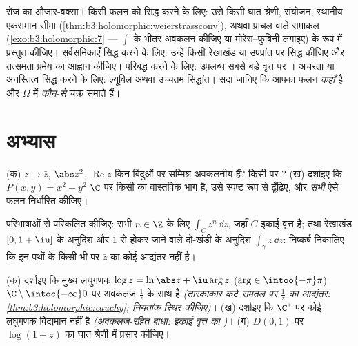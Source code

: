 \begin{method}\label{met:b3:holomorphic:toolkit}
रोज का औजार-बक्सा। किसी फलन को  सिद्ध करने के लिए: उसे
किसी घात श्रेणी, संयोजन, स्थानीय एकसमान सीमा (\cref{thm:b3:holomorphic:weierstrassconv}), अथवा
 प्राचल वाले समाकल (\cref{exo:b3:holomorphic:7} --- $\int$ के भीतर अवकलन
कीजिए या मोरेरा--फुबिनी लगाइए) के रूप में प्रस्तुत कीजिए।
सर्वसमिकाएँ सिद्ध करने के लिए: उन्हें किसी रेखाखंड या उपप्रांत पर
सिद्ध कीजिए और तत्समता प्रमेय का आह्वान कीजिए। परिबद्ध करने के
लिए: उपलब्ध सबसे बड़े वृत्त पर । अचरता या अनस्तित्व सिद्ध
करने के लिए: ल्यूविल अथवा उच्चतम सिद्धांत। सदा जानिए कि आपका फलन
\emph{कहाँ}  है और $\Omega$ में \emph{कौन-से} चक्र समाते
हैं।
\end{method}

\section{अभ्यास}

\begin{exercise}[$\star$]\label{exo:b3:holomorphic:1}
(क) $z \mapsto \bar z$, $\abs z^2$, $\operatorname{Re}z$ किन बिंदुओं पर सम्मिश्र-अवकलनीय हैं? किसी
 पर ?
(ख) दर्शाइए कि $P(x, y) = x^2 - y^2$ $\C$ पर किसी  का वास्तविक भाग
है, उसे स्पष्ट रूप से ढूँढ़िए, और \emph{सभी} ऐसे फलन निर्धारित
कीजिए।
\end{exercise}

\begin{exercise}[$\star$]\label{exo:b3:holomorphic:2}
परिभाषाओं से परिकलित कीजिए: सभी $n
\in \Z$ के लिए $\int_{C}z^n\,\dd z$, जहाँ $C$
इकाई वृत्त है; तथा रेखाखंड $[0, 1+\iu]$ के अनुदिश और $1$ से होकर जाने
वाले दो-खंडी  के अनुदिश $\int_\gamma\bar z\,\dd z$: निष्कर्ष निकालिए कि इन पथों के
किसी भी  पर $\bar z$ का कोई आद्यंतर नहीं है।
\end{exercise}

\begin{exercise}[$\star\star$]\label{exo:b3:holomorphic:3}
(क) दर्शाइए कि मुख्य लघुगणक $\log z = \ln\abs z +
\iu\arg z$ ($\arg \in \intoo{-\pi}\pi$) $\C\setminus\intoc{-\infty}0$ पर अवकलज $\frac1z$
के साथ  है \emph{(तारकाकार कटे समतल पर $\frac1z$ का
आद्यंतर: \cref{thm:b3:holomorphic:cauchy}; नियतांक स्थिर कीजिए)}।
(ख) दर्शाइए कि $\C^*$ पर कोई  लघुगणक विद्यमान नहीं है
\emph{(अवकलज-रहित बाधा: इकाई वृत्त का )}।
(ग) $D(0,1)$ पर $\log(1 + z)$ का घात श्रेणी में प्रसार कीजिए।
\end{exercise}

